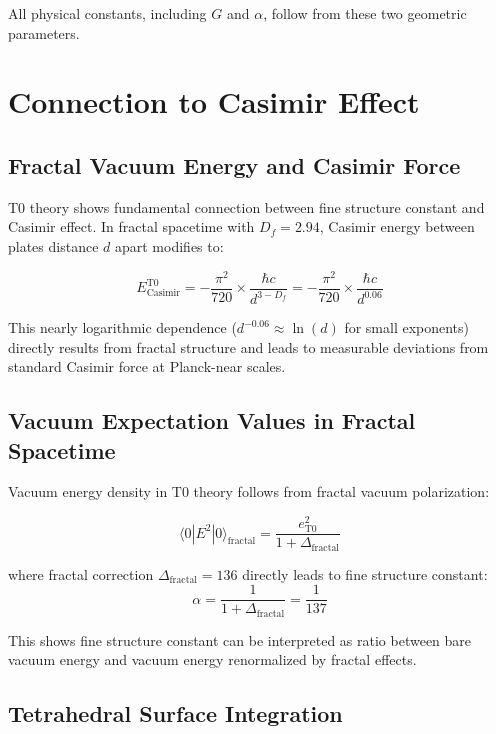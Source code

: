 \documentclass[12pt,a4paper]{article}
\theoremstyle{definition}
\begin{document}
	All physical constants, including $G$ and $\alpha$, follow from these two geometric parameters.
	
	\section{Connection to Casimir Effect}
	
	\subsection{Fractal Vacuum Energy and Casimir Force}
	
	T0 theory shows fundamental connection between fine structure constant and Casimir effect. In fractal spacetime with $D_f = 2.94$, Casimir energy between plates distance $d$ apart modifies to:
	
	\begin{equation}
		E_{\text{Casimir}}^{\text{T0}} = -\frac{\pi^2}{720} \times \frac{\hbar c}{d^{3-D_f}} = -\frac{\pi^2}{720} \times \frac{\hbar c}{d^{0.06}}
	\end{equation}
	
	This nearly logarithmic dependence ($d^{-0.06} \approx \ln(d)$ for small exponents) directly results from fractal structure and leads to measurable deviations from standard Casimir force at Planck-near scales.
	
	\subsection{Vacuum Expectation Values in Fractal Spacetime}
	
	Vacuum energy density in T0 theory follows from fractal vacuum polarization:
	
	\begin{equation}
		\langle 0|E^2|0 \rangle_{\text{fractal}} = \frac{e_{\text{T0}}^2}{1 + \Delta_{\text{fractal}}}
	\end{equation}
	
	where fractal correction $\Delta_{\text{fractal}} = 136$ directly leads to fine structure constant:
	\begin{equation}
		\alpha = \frac{1}{1 + \Delta_{\text{fractal}}} = \frac{1}{137}
	\end{equation}
	
	This shows fine structure constant can be interpreted as ratio between bare vacuum energy and vacuum energy renormalized by fractal effects.
	
	\subsection{Tetrahedral Surface Integration}
	
\end{document}
